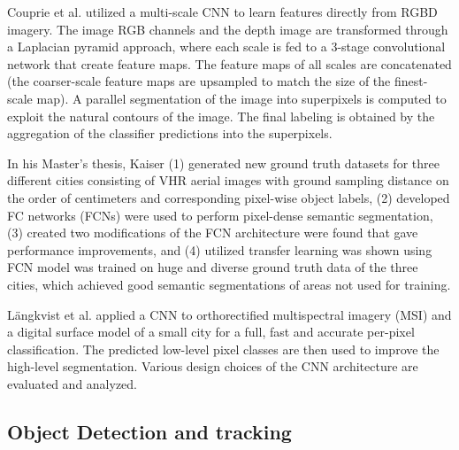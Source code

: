 \documentclass[12pt]{spieman}
\begin{document}
\begin{spacing}{1}
Couprie et al. \cite{Couprie2013Indoor} utilized a multi-scale CNN to learn features directly from RGBD imagery. The image RGB channels and the depth image are transformed through a Laplacian pyramid approach, where each scale is fed to a 3-stage convolutional network that create feature maps. The feature maps of all scales are concatenated (the coarser-scale feature maps are upsampled to match the size of the finest-scale map). A parallel segmentation of the image into superpixels is computed to exploit the natural contours of the image. The final labeling is obtained by the aggregation of the classifier predictions into the superpixels.

In his Master's thesis, Kaiser \cite{Kaiser2016Learning} (1) generated new ground truth datasets for three different cities consisting of VHR aerial images with ground sampling distance on the order of centimeters and corresponding pixel-wise object labels, (2) developed FC networks (FCNs) were used to perform pixel-dense semantic segmentation, (3) created two modifications of the FCN architecture were found that gave performance improvements, and (4) utilized transfer learning was shown using FCN model was trained on huge and diverse ground truth data of the three cities, which achieved good semantic segmentations of areas not used for training.  

L{\"{a}}ngkvist et al. \cite{Langkvist2016Classification} applied a CNN to orthorectified multispectral imagery (MSI) and a digital surface model of a small city for a full, fast and accurate per-pixel classification. The predicted low-level pixel classes are then used to improve the high-level segmentation. Various design choices of the CNN architecture are evaluated and analyzed.

\subsection{Object Detection and tracking}



\end{spacing}
\end{document}
